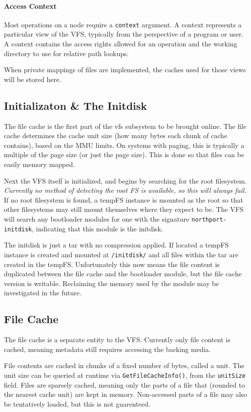 \paragraph{Access Context}
Most operations on a node require a \verb|context| argument. A context represents a particular view of the VFS, typically from the perspective of a program or user. A context contains the access rights allowed for an operation and the working directory to use for relative path lookups.

When private mappings of files are implemented, the caches used for those views will be stored here.

\subsection{Initializaton \& The Initdisk}
The file cache is the first part of the vfs subsystem to be brought online. The file cache determines the cache unit size (how many bytes each chunk of cache contains), based on the MMU limits. On systems with paging, this is typically a multiple of the page size (or just the page size). This is done so that files can be easily memory mapped.

Next the VFS itself is initialized, and begins by searching for the root filesystem. \textit{Currently no method of detecting the root FS is available, so this will always fail.} If no root filesystem is found, a tempFS instance is mounted as the root so that other filesystems may still mount themselves where they expect to be. The VFS will search any bootloader modules for one with the signature \verb|northport-initdisk|, indicating that this module is the initdisk.

The initdisk is just a tar with no compression applied. If located a tempFS instance is created and mounted at \verb|/initdisk/| and all files within the tar are created in the tempFS. Unfortunately this now means the file content is duplicated between the file cache and the bootloader module, but the file cache version is writable. Reclaiming the memory used by the module may be investigated in the future.

\subsection{File Cache}
The file cache is a separate entity to the VFS. Currently only file content is cached, meaning metadata still requires accessing the backing media.

File contents are cached in chunks of a fixed number of bytes, called a unit. The unit size can be queried at runtime via \verb|GetFileCacheInfo()|, from the \verb|unitSize| field. Files are sparsely cached, meaning only the parts of a file that (rounded to the nearest cache unit) are kept in memory. Non-accessed parts of a file may also be tentatively loaded, but this is not guarenteed.


